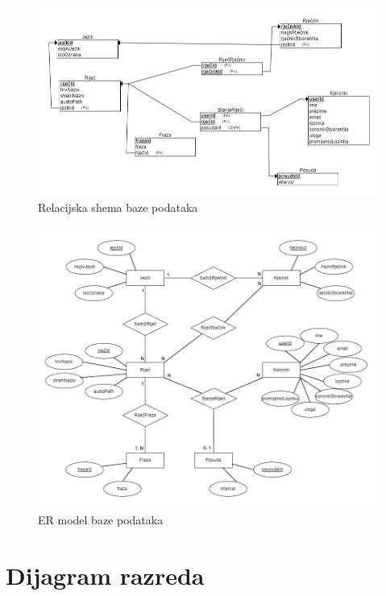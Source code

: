 			\begin{figure}[htp]
				\includegraphics[scale=0.5]{dijagrami/relacijski_model.png}
				\centering
				\caption{Relacijska shema baze podataka}
				\label{fig:dijagram_REL-SH_BP}
			\end{figure}

				\begin{figure}[htp]
					\includegraphics[scale=0.5]{dijagrami/ER_model_BP_3.png}
					\centering
					\caption{ER model baze podataka}
					\label{fig:dijagram_ER-BP}
				\end{figure}
			
			\eject
			
			
		\section{Dijagram razreda}
		
